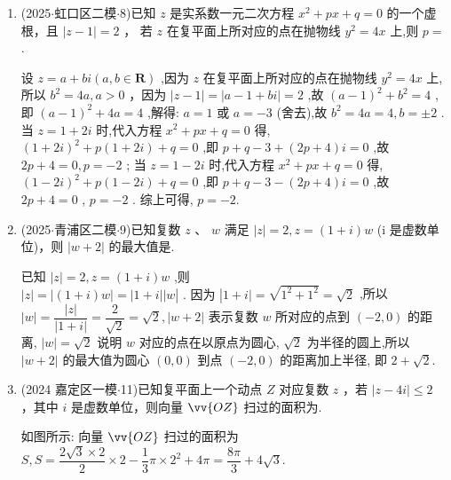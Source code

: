\begin{enumerate}
    \item (2025$\cdot$虹口区二模$\cdot$8)已知 $z$ 是实系数一元二次方程 ${x}^{2} + {px} + q = 0$ 的一个虚根，且 $\left| {z - 1}\right|  = 2$ ， 若 $z$ 在复平面上所对应的点在抛物线 ${y}^{2} = {4x}$ 上,则 $p =$ .
    \begin{jieda}
        设 $z = a + b{i}\left( {a,b \in  \mathbf{R}}\right)$ ,因为 $z$ 在复平面上所对应的点在抛物线 ${y}^{2} = {4x}$ 上,所以 ${b}^{2} = {4a},a > 0$ ，因为 $\left| {z - 1}\right|  =  \left| {a - 1 + b{i}}\right|  = 2$ ,故 ${\left( a - 1\right) }^{2} + {b}^{2} = 4$ ,即 ${\left( a - 1\right) }^{2} + {4a} = 4$ ,解得: $a = 1$ 或 $a =  - 3$ (舍去),故 ${b}^{2} = {4a} = 4,b =  \pm  2$ . 当 $z =  1 + 2{i}$ 时,代入方程 ${x}^{2} + {px} + q = 0$ 得, ${\left( 1 + 2{i}\right) }^{2} + p\left( {1 + 2{i}}\right)  + q = 0$ ,即 $p + q - 3 + \left( {{2p} + 4}\right) {i} = 0$ ,故 ${2p} + 4 = 0,p =  - 2$ ; 当 $z = 1 - 2{i}$ 时,代入方程 ${x}^{2} + {px} + q = 0$ 得, ${\left( 1 - 2{i}\right) }^{2} +  p\left( {1 - 2{i}}\right)  + q = 0$ ,即 $p + q - 3 - \left( {{2p} + 4}\right) {i} = 0$ ,故 ${2p} + 4 = 0$ , $p =  - 2$ . 综上可得, $p =  - 2$.
    \end{jieda}

    \item (2025$\cdot$青浦区二模$\cdot$9)已知复数 $z$ 、 $w$ 满足 $\left| z\right|  = 2,z = \left( {1 + {i}}\right) w$ (i 是虚数单位)，则 $\left| {w + 2}\right|$ 的最大值是.
    \begin{jieda}
        已知 $\left| z\right|  = 2,z = \left( {1 + {i}}\right) w$ ,则 $\left| z\right|  = \left| {\left( {1 + {i}}\right) w}\right|  =  \mid  1 +  {i}\left| \right| w\left| \text{ . 因为 }\right| 1 + {i} \mid   = \sqrt{{1}^{2} + {1}^{2}} = \sqrt{2}$ ,所以 $\left| w\right|  = \dfrac{\left| z\right| }{\left| 1 + {i}\right| } = \dfrac{2}{\sqrt{2}} =  \sqrt{2},\left| {w + 2}\right|$ 表示复数 $w$ 所对应的点到 $\left( {-2,0}\right)$ 的距离, $\left| w\right|  =  \sqrt{2}$ 说明 $w$ 对应的点在以原点为圆心, $\sqrt{2}$ 为半径的圆上,所以 $\left| {w + 2}\right|$ 的最大值为圆心 $\left( {0,0}\right)$ 到点 $\left( {-2,0}\right)$ 的距离加上半径, 即 $2 + \sqrt{2}$.
    \end{jieda}

    \item (2024 嘉定区一模$\cdot$11)已知复平面上一个动点 $Z$ 对应复数 $z$ ，若 $\left| {z - 4{i}}\right|  \leq  2$ ，其中 ${i}$ 是虚数单位，则向量 $\vv{OZ}$ 扫过的面积为.
    \begin{jieda}
        如图所示: 向量 $\vv{OZ}$ 扫过的面积为 $S,S = \dfrac{2\sqrt{3} \times  2}{2} \times  2 - \dfrac{1}{3}\pi  \times  {2}^{2} + {4\pi } = \dfrac{8\pi }{3} + 4\sqrt{3}.$


\end{jieda}
\end{enumerate}

